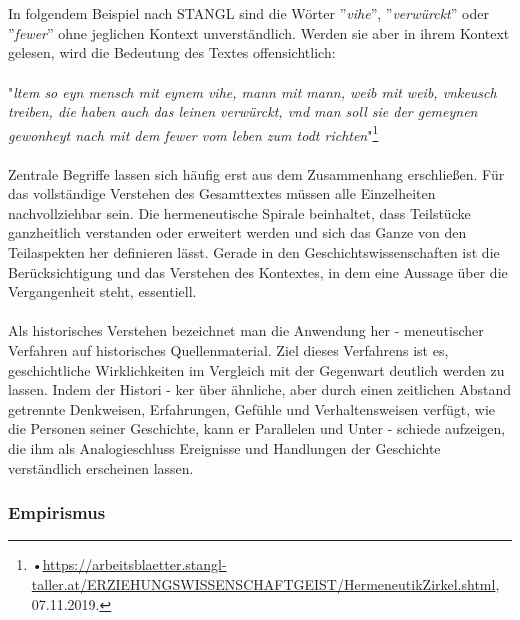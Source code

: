 \documentclass[12pt,a4paper]{article}
\begin{document}
\\
\\
In folgendem Beispiel nach STANGL sind die Wörter ''\textit{vihe}'', ''\textit{verwürckt}'' oder ''\textit{fewer}'' ohne jeglichen Kontext unverständlich. Werden sie aber in ihrem Kontext gelesen, wird die Bedeutung des Textes offensichtlich:
\\
\\
"\textit{ltem so eyn mensch mit eynem vihe, mann mit mann, weib mit weib, vnkeusch treiben, die haben auch das leinen verwürckt, vnd man soll sie der gemeynen gewonheyt nach mit dem fewer vom leben zum todt richten}"\footnote{•\protect\url{https://arbeitsblaetter.stangl-taller.at/ERZIEHUNGSWISSENSCHAFTGEIST/HermeneutikZirkel.shtml}, 07.11.2019.}
\\
\\
Zentrale Begriffe lassen sich häufig erst aus dem Zusammenhang erschließen. Für das vollständige Verstehen des Gesamttextes müssen alle Einzelheiten nachvollziehbar sein. Die hermeneutische Spirale beinhaltet, dass Teilstücke ganzheitlich verstanden oder erweitert werden und sich das Ganze von den Teilaspekten her definieren lässt. Gerade in den Geschichtswissenschaften ist die Berücksichtigung und das Verstehen des Kontextes, in dem eine Aussage über die Vergangenheit steht, essentiell.
\\
\\
Als historisches Verstehen bezeichnet man die Anwendung her - meneutischer Verfahren auf historisches Quellenmaterial. Ziel dieses Verfahrens ist es, geschichtliche Wirklichkeiten im Vergleich mit der Gegenwart deutlich werden zu lassen. Indem der Histori - ker über ähnliche, aber durch einen zeitlichen Abstand getrennte Denkweisen, Erfahrungen, Gefühle und Verhaltensweisen verfügt, wie die Personen seiner Geschichte, kann er Parallelen und Unter - schiede aufzeigen, die ihm als Analogieschluss Ereignisse und Handlungen der Geschichte verständlich erscheinen lassen.



\subsubsection{Empirismus}
\end{document}
